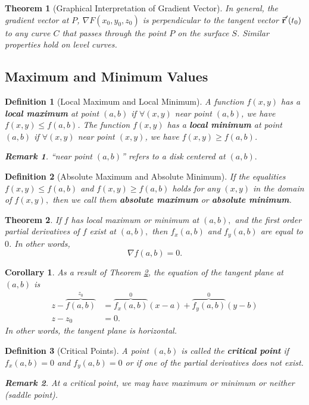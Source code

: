 \documentclass[12pt,a4paper]{article}
\newtheorem{thm}{Theorem}[subsection]
\newtheorem{df}{Definition}[subsection]
\newtheorem{cor}{Corollary}[section]
\newtheorem*{rmk}{\indent Remark}
\def\vecr{\va{{\textbf{r}}}}
\begin{document}
\begin{thm}[Graphical Interpretation of Gradient Vector]
	In general, the gradient vector at $P$, $\nabla F(x_0,y_0,z_0)$ is perpendicular to the tangent vector $\vecr'(t_0)$ to any curve $C$ that passes through the point $P$ on the surface $S$. Similar properties hold on level curves. 
\end{thm}

\subsection{Maximum and Minimum Values}
\begin{df}[Local Maximum and Local Minimum]
	A function $f(x,y)$ has a \textbf{local maximum} at point $(a,b)$ if $\forall(x,y)$ near point $(a,b)$, we have $f(x,y)\leq f(a,b)$. The function $f(x,y)$ has a \textbf{local minimum} at point $(a,b)$ if $\forall (x,y)$ near point $(x,y)$, we have $f(x,y)\geq f(a,b)$.
	\begin{rmk} ``near point $(a,b)$'' refers to a disk centered at $(a,b).$ \end{rmk}
\end{df}
\begin{df}[Absolute Maximum and Absolute Minimum]
	If the equalities $f(x,y)\leq f(a,b)$ and $f(x,y)\geq f(a,b)$ holds for any $(x,y)$ in the domain of $f(x,y),$ then we call them \textbf{absolute maximum} or \textbf{absolute minimum}.	
\end{df}
\begin{thm}\label{thm3.7.1}
	If $f$ has local maximum or minimum at $(a,b),$ and the first order partial derivatives of $f$ exist at $(a,b),$ then $f_x(a,b)$ and $f_y(a,b)$ are equal to $0$. In other words, \[\nabla f(a,b)=0.\]	
\end{thm}
\begin{cor}
	As a result of Theorem \ref{thm3.7.1}, the equation of the tangent plane at $(a,b)$ is \[\begin{aligned}z-\overbrace{f(a,b)}^{z_0}&=\overbrace{f_x(a,b)}^{0}(x-a)+\overbrace{f_y(a,b)}^{0}(y-b)\\z-z_0&=0.\end{aligned}\] In other words, the tangent plane is horizontal. 
\end{cor}
\begin{df}[Critical Points]
	A point $(a,b)$ is called the \textbf{critical point} if $f_x(a,b)=0$ and $f_y(a,b)=0$ or if one of the partial derivatives does not exist. 
	\begin{rmk} At a critical point, we may have maximum or minimum or neither (saddle point). \end{rmk}	
\end{df}
\end{document}

